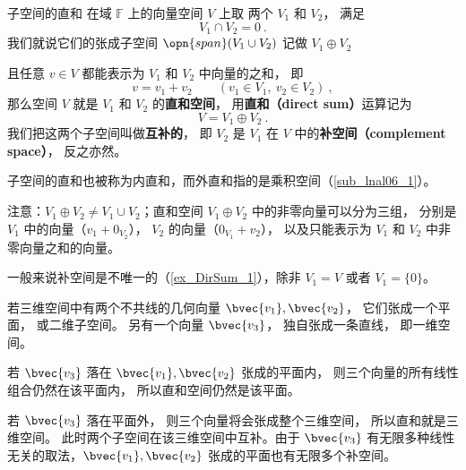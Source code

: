 
\begin{issues}
\issueTODO
\end{issues}



\begin{definition}{子空间的直和}\label{def_DirSum_1}
在域 $\mathbb F$ 上的向量空间 $V$ 上取 两个 $V_1$ 和 $V_2$， 满足
\begin{equation}
V_1 \cap V_2 = \qty{0}~.
\end{equation}
我们就说它们的张成子空间 $\opn{span} (V_1 \cup V_2)$ 记做 $V_1 \oplus V_2$

且任意 ${v} \in V$ 都能表示为 $V_1$ 和 $V_2$ 中向量的之和， 即
\begin{equation}\label{eq_DirSum_2}
v = v_1 + v_2
\qquad
(v_1 \in V_1,\ v_2 \in V_2)~,
\end{equation}
那么空间 $V$ 就是 $V_1$ 和 $V_2$ 的\textbf{直和空间}， 用\textbf{直和（direct sum）}运算记为
\begin{equation}
V = V_1 \oplus V_2~.
\end{equation}
我们把这两个子空间叫做\textbf{互补的}， 即 $V_2$ 是 $V_1$ 在 $V$ 中的\textbf{补空间（complement space）}， 反之亦然。
\end{definition}

子空间的直和也被称为内直和，而外直和指的是乘积空间（\autoref{sub_lnal06_1}）。


注意：$V_1 \oplus V_2 \neq V_1 \cup V_2$；直和空间 $V_1 \oplus V_2$ 中的非零向量可以分为三组， 分别是 $V_1$ 中的向量（$v_1 + 0_{V_2}$）， $V_2$ 的向量（$0_{V_1} + v_2$）， 以及只能表示为 $V_1$ 和 $V_2$ 中非零向量之和的向量。

一般来说补空间是不唯一的（\autoref{ex_DirSum_1}），除非 $V_1 = V$ 或者 $V_1 = \{0\}$。

\begin{example}{}\label{ex_DirSum_1}
若三维空间中有两个不共线的几何向量 $\bvec{v_1}, \bvec{v_2}$， 它们张成一个平面， 或二维子空间。 另有一个向量 $\bvec{v_3}$， 独自张成一条直线， 即一维空间。

若 $\bvec{v_3}$ 落在 $\bvec{v_1}, \bvec{v_2}$ 张成的平面内， 则三个向量的所有线性组合仍然在该平面内， 所以直和空间仍然是该平面。

若 $\bvec{v_3}$ 落在平面外， 则三个向量将会张成整个三维空间， 所以直和就是三维空间。 此时两个子空间在该三维空间中互补。由于 $\bvec{v_3}$ 有无限多种线性无关的取法，$\bvec{v_1}, \bvec{v_2}$ 张成的平面也有无限多个补空间。
\end{example}

